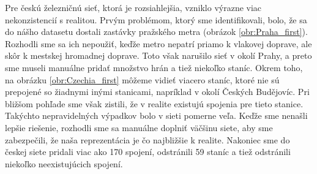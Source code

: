 \documentclass[main.tex]{subfiles}
\begin{document}
Pre českú železničnú sieť, ktorá je rozsiahlejšia, vzniklo výrazne viac nekonzistencií s realitou. Prvým problémom, ktorý sme identifikovali, bolo, že sa do nášho datasetu dostali zastávky pražského metra (obrázok \ref{obr:Praha_first}). Rozhodli sme sa ich nepoužiť, keďže metro nepatrí priamo k vlakovej doprave, ale skôr k mestskej hromadnej doprave. Toto však narušilo sieť v okolí Prahy, a preto sme museli manuálne pridať množstvo hrán a tiež niekoľko staníc. Okrem toho, na obrázku \ref{obr:Czechia_first} môžeme vidieť viacero staníc, ktoré nie sú prepojené so žiadnymi inými stanicami, napríklad v okolí Českých Budějovíc. Pri bližšom pohľade sme však zistili, že v realite existujú spojenia pre tieto stanice. Takýchto nepravidelných výpadkov bolo v sieti pomerne veľa. Keďže sme nenašli lepšie riešenie, rozhodli sme sa manuálne doplniť väčšinu siete, aby sme zabezpečili, že naša reprezentácia je čo najbližšie k realite. Nakoniec sme do českej siete pridali viac ako 170 spojení, odstránili 59 staníc a tiež odstránili niekoľko neexistujúcich spojení.





\end{document}
